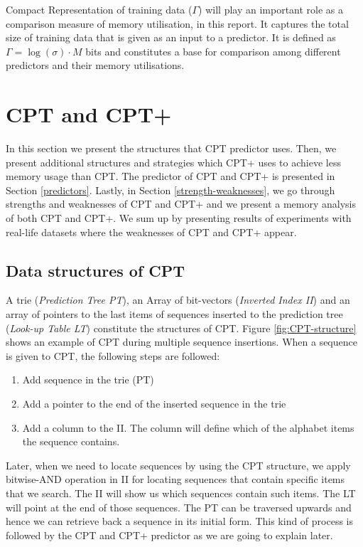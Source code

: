 \par Compact Representation of training data (\(\Gamma\)) will play an important role as a comparison measure of memory utilisation, in this report. It captures the total size of training data that is given as an input to a predictor. It is defined as \(\Gamma = \log(\sigma) \cdot M \) bits and constitutes a base for comparison among different predictors and their memory utilisations.

\section{CPT and CPT+}\label{CPT}
In this section we present the structures that CPT predictor uses. Then, we present additional structures and strategies which CPT+ uses to achieve less memory usage than CPT. The predictor of CPT and CPT+ is presented in Section \ref{predictors}. Lastly, in Section \ref{strength-weaknesses}, we go through strengths and weaknesses of CPT and CPT+   and we present a memory analysis of both CPT and CPT+. We sum up by presenting results of experiments with real-life datasets where the weaknesses of CPT and CPT+ appear.
\subsection{Data structures of CPT}

A trie (\emph{Prediction Tree PT}), an Array of bit-vectors (\emph{Inverted Index II}) and an array of pointers to the last items of sequences inserted to the prediction tree (\emph{Look-up Table LT}) constitute the structures of CPT. Figure \ref{fig:CPT-structure} shows an example of CPT during multiple sequence insertions. When a sequence is given to CPT, the following steps are followed:

\begin{enumerate}
	\item Add sequence in the trie (PT)
	\item Add a pointer to the end of the inserted sequence in the trie
	\item Add a column to the II. The column will define which of the alphabet items the sequence contains.
\end{enumerate}

Later, when we need to locate sequences by using the CPT structure, we apply bitwise-AND operation in II for locating sequences that contain specific items that we search. The II will show us which sequences contain such items. The LT will point at the end of those sequences. The PT can be traversed upwards and hence we can retrieve back a sequence in its initial form. This kind of process is followed by the CPT and CPT+ predictor as we are going to explain later.

